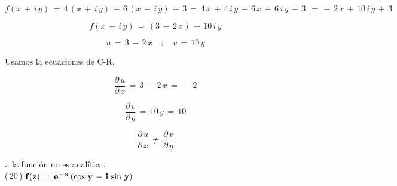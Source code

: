 \documentclass[a4paper,11pt,openany]{book}
\begin{document}
$$f(x\,+\,i\,y)\,=\,4\,(x\,+\,i\,y)\,-\,6\,(x\,-\,i\,y)\,+\,3\,=\,4\,x\,+\,4\,i\,y\,-\,6\,x\,+\,6\,i\,y\,+\,3,=\,-\,2\,x\,+\,10\,i\,y\,+\,3$$

$$f(x\,+\,i\,y)\,=\,(3\,-\,2\,x)\,+\,10\,i\,y$$

$$u\,=\,3\,-\,2\,x \quad;\quad v\,=\,10\,y$$

\textcolor{ao(english)}{} Usamos la ecuaciones de C-R.

$$\dfrac{\partial\,u}{\partial\,x}\,=\,3\,-\,2\,x\,=\,-\,2$$

$$\dfrac{\partial\,v}{\partial\,y}\,=\,10\,y\,=\,10$$

$$\dfrac{\partial\,u}{\partial\,x}\,\neq\,\dfrac{\partial\,v}{\partial\,y}$$

$\therefore$ la función no es analítica.\\

\textcolor{ao(english)}{(\,20\,)} $\bf{f(z)\,=\,e^{-\,x}\,(\cos\,y\,-\,i\,\sin\,y)}$
\end{document}
